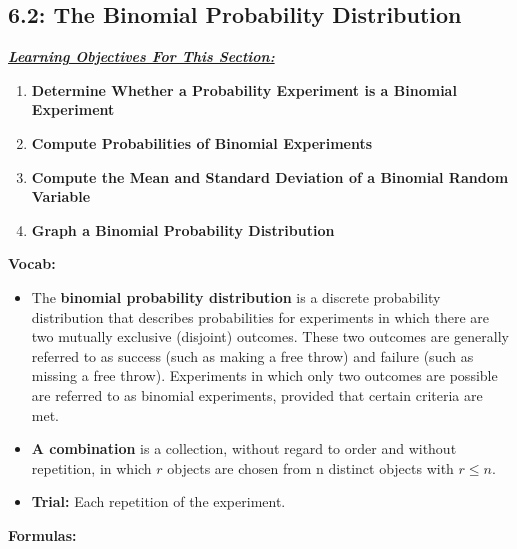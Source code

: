 \documentclass{report}
\begin{document}
        \subsection*{6.2: The Binomial Probability Distribution}
      \bigbreak \noindent 
      \textbf{\textit{\underline{Learning Objectives For This Section:}}}
      \begin{enumerate}
            \item \textbf{Determine Whether a Probability Experiment is a Binomial Experiment}
          \item \textbf{Compute Probabilities of Binomial Experiments}
          \item \textbf{Compute the Mean and Standard Deviation of a Binomial Random Variable}
          \item \textbf{Graph a Binomial Probability Distribution}
      \end{enumerate}
      \bigbreak \noindent 
      \textbf{Vocab:}
      \begin{itemize}
          \item The \textbf{binomial probability distribution} is a discrete probability distribution that describes probabilities for experiments in which there are two mutually exclusive (disjoint) outcomes. These two outcomes are generally referred to as success (such as making a free throw) and failure (such as missing a free throw). Experiments in which only two outcomes are possible are referred to as binomial experiments, provided that certain criteria are met.
          \item \textbf{A combination} is a collection, without regard to order and without repetition, in which  $r $  objects are chosen from  n  distinct objects with  $r \leq n $.
        \item \textbf{Trial:} Each repetition of the experiment. 

      \end{itemize}
      \bigbreak \noindent 
      \textbf{Formulas:}
\end{document}
